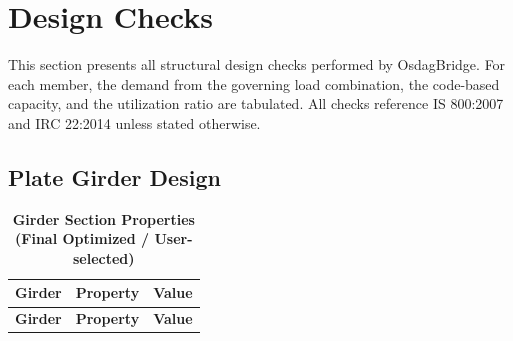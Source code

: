 \documentclass[12pt,a4paper]{report}
\numberwithin{table}{chapter}
\numberwithin{figure}{chapter}
\newcommand{\ReportTableRowGap}{6pt}
\begin{document}
\chapter{Design Checks}

This section presents all structural design checks performed by OsdagBridge. For each member, the demand from the governing load combination, the code-based capacity, and the utilization ratio are tabulated. All checks reference IS 800:2007 and IRC 22:2014 unless stated otherwise.

\section{Plate Girder Design}
\label{sec:plate-girder}

\vspace{1em}
\begin{longtable}{|C{2.5cm}|L{8.0cm}|>{\centering\arraybackslash}p{5.0cm}|}
\caption{\textbf{Girder Section Properties (Final Optimized / User-selected)}}\\
\hline
\textbf{Girder} & \textbf{Property} & \textbf{Value} \\[\ReportTableRowGap]
\hline
\endfirsthead
\hline
\textbf{Girder} & \textbf{Property} & \textbf{Value} \\[\ReportTableRowGap]
\hline
\endhead


\end{longtable}
\end{document}
